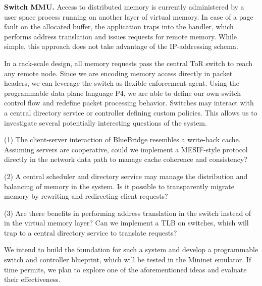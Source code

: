 \textbf{Switch MMU.} Access to distributed memory is
currently administered by a user space process running on another layer of
virtual memory. In case of a page fault on the allocated buffer, the application
traps into the handler, which performs address translation and issues requests
for remote memory. While simple, this approach does not take advantage of the
IP-addressing schema.

In a rack-scale design, all memory requests pass the central ToR switch to reach
any remote node. Since we are encoding memory access directly in packet headers,
we can leverage the switch as flexible enforcement agent. Using the programmable
data plane language P4, we are able to define our own switch control flow and
redefine packet processing behavior. Switches may interact with a central
directory service or controller defining custom policies. This allows us to
investigate several potentially interesting questions of the system.

(1) The client-server interaction of BlueBridge resembles a write-back cache.
Assuming servers are cooperative, could we implement a MESIF-style protocol
directly in the network data path to manage cache coherence and consistency?

(2) A central scheduler and directory service may manage the distribution and
balancing of memory in the system. Is it possible to transparently migrate
memory by rewriting and redirecting client requests?

(3) Are there benefits in performing address translation in the switch instead
of in the virtual memory layer? Can we implement a TLB
on switches, which will trap to a central directory service to translate requests?

We intend to build the foundation for such a system and develop a programmable
switch and controller blueprint, which will be tested in the Mininet emulator.
If time permits, we plan to explore one of the aforementioned ideas and evaluate
their effectiveness.
